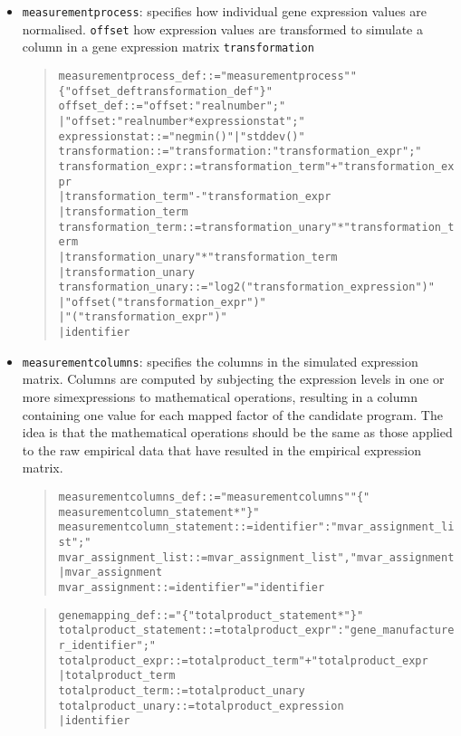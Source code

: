 \documentclass[a4paper,fleqn]{article}
\newcommand{\computercode}[1]{\texttt{#1}}
\newenvironment{ebnfrule}{\begin{footnotesize}\begin{quote}\begin{alltt}}{\end{alltt}\end{quote}\end{footnotesize}}
\begin{document}
\begin{itemize}
\item\computercode {measurementprocess}: specifies how individual gene
  expression values are normalised. \computercode{offset} how
  expression values are transformed to simulate a column in a gene
  expression matrix \computercode{transformation}

\begin{ebnfrule}

measurementprocess_def ::= "measurementprocess" "\{" offset_def transformation_def "\}"
offset_def ::= "offset:" realnumber ";"
        | "offset:" realnumber * expressionstat ";"
expressionstat ::= "negmin()" | "stddev()"
transformation ::= "transformation:" transformation_expr ";"
transformation_expr ::= transformation_term "+" transformation_expr
        | transformation_term "-" transformation_expr
        | transformation_term
transformation_term ::= transformation_unary "*" transformation_term
        | transformation_unary "*" transformation_term
        | transformation_unary
transformation_unary ::= "log2(" transformation_expression ")"
        | "offset(" transformation_expr ")"
        | "(" transformation_expr ")"
        | identifier

\end{ebnfrule}

\item \computercode{measurementcolumns}: specifies the columns in the
  simulated expression matrix. Columns are computed by subjecting the
  expression levels in one or more simexpressions to mathematical
  operations, resulting in a column containing one value for each
  mapped factor of the candidate program. The idea is that the
  mathematical operations should be the same as those applied to the
  raw empirical data that have resulted in the empirical expression
  matrix.

\begin{ebnfrule}
measurementcolumns_def ::=  "measurementcolumns" "\{" 
measurementcolumn_statement* "\}"
measurementcolumn_statement ::= identifier ":" mvar_assignment_list ";"
mvar_assignment_list ::= mvar_assignment_list "," mvar_assignment
        | mvar_assignment
mvar_assignment ::= identifier "=" identifier
\end{ebnfrule}

\begin{ebnfrule}
genemapping_def ::= "\{" totalproduct_statement* "\}" 
totalproduct_statement ::= totalproduct_expr ":" gene_manufacturer_identifier ";"
totalproduct_expr ::= totalproduct_term "+" totalproduct_expr
        | totalproduct_term
totalproduct_term ::= totalproduct_unary
totalproduct_unary ::= totalproduct_expression
        | identifier


\end{ebnfrule}
\end{itemize}
\end{document}
